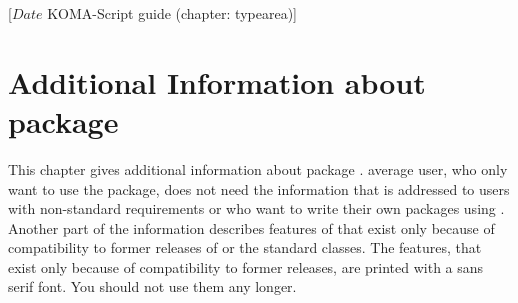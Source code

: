 %
%
%
%
%
%
%
%
% 
%
%
%
%

                 [$Date$
                  KOMA-Script guide (chapter: typearea)]


\chapter{Additional Information about package }

This chapter gives additional information about package
.  average user, who only want to use the package,
does not need the information that is addressed to users with non-standard
requirements or who want to write their own packages using
. Another part of the information describes features of
 that exist only because of compatibility to former releases
of \KOMAScript{} or the standard classes. The features, that exist only
because of compatibility to former \KOMAScript{} releases, are printed with a
sans serif font. You should not use them any longer.


